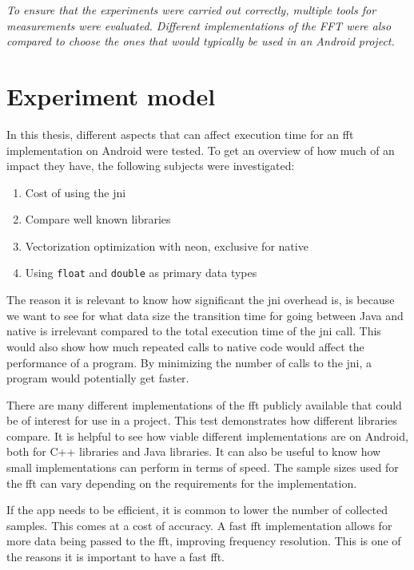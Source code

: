 \textit{To ensure that the experiments were carried out correctly, multiple tools for measurements were evaluated. Different implementations of the FFT were also compared to choose the ones that would typically be used in an Android project.}

\section{Experiment model}


In this thesis, different aspects that can affect execution time for an \gls{fft} implementation on Android were tested. To get an overview of how much of an impact they have, the following subjects were investigated:

\begin{enumerate}
    \item Cost of using the \gls{jni}
    \item Compare well known libraries
    \item Vectorization optimization with \gls{neon}, exclusive for native
    \item Using \texttt{float} and \texttt{double} as primary data types
\end{enumerate}

The reason it is relevant to know how significant the \gls{jni} overhead is, is because we want to see for what data size the transition time for going between Java and native is irrelevant compared to the total execution time of the \gls{jni} call. This would also show how much repeated calls to native code would affect the performance of a program. By minimizing the number of calls to the \gls{jni}, a program would potentially get faster.

There are many different implementations of the \gls{fft} publicly available that could be of interest for use in a project. This test demonstrates how different libraries compare. It is helpful to see how viable different implementations are on Android, both for C++ libraries and Java libraries. It can also be useful to know how small implementations can perform in terms of speed. The sample sizes used for the \gls{fft} can vary depending on the requirements for the implementation.

If the app needs to be efficient, it is common to lower the number of collected samples. This comes at a cost of accuracy. A fast \gls{fft} implementation allows for more data being passed to the \gls{fft}, improving frequency resolution. This is one of the reasons it is important to have a fast \gls{fft}.

